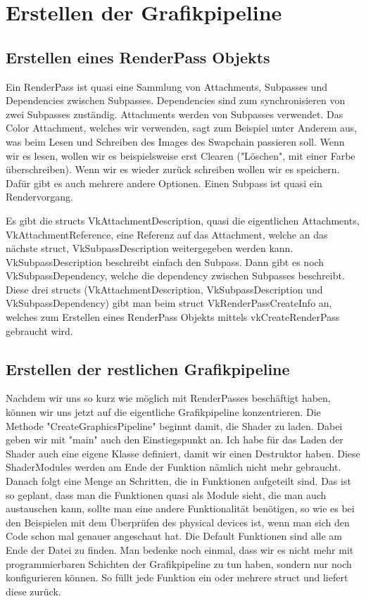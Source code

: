 \documentclass[11pt,a4paper]{report}
\begin{document}
\section{Erstellen der Grafikpipeline}
\subsection{Erstellen eines RenderPass Objekts}
Ein RenderPass ist quasi eine Sammlung von Attachments, Subpasses und Dependencies zwischen Subpasses. Dependencies sind zum synchronisieren von zwei Subpasses zuständig. Attachments werden von Subpasses verwendet. Das Color Attachment, welches wir verwenden, sagt zum Beispiel unter Anderem aus, was beim Lesen und Schreiben des Images des Swapchain passieren soll. Wenn wir es lesen, wollen wir es beispielsweise erst Clearen ("Löschen", mit einer Farbe überschreiben). Wenn wir es wieder zurück schreiben wollen wir es speichern. Dafür gibt es auch mehrere andere Optionen. Einen Subpass ist quasi ein Rendervorgang.

Es gibt die structs VkAttachmentDescription, quasi die eigentlichen Attachments, VkAttachmentReference, eine Referenz auf das Attachment, welche an das nächste struct, VkSubpassDescription weitergegeben werden kann. VkSubpassDescription beschreibt einfach den Subpass. Dann gibt es noch VkSubpassDependency, welche die dependency zwischen Subpasses beschreibt. Diese drei structs (VkAttachmentDescription, VkSubpassDescription und VkSubpassDependency) gibt man beim struct VkRenderPassCreateInfo an, welches zum Erstellen eines RenderPass Objekts mittels vkCreateRenderPass gebraucht wird.

\subsection{Erstellen der restlichen Grafikpipeline}
Nachdem wir uns so kurz wie möglich mit RenderPasses beschäftigt haben, können wir uns jetzt auf die eigentliche Grafikpipeline konzentrieren. Die Methode "CreateGraphicsPipeline" beginnt damit, die Shader zu laden. Dabei geben wir mit "main" auch den Einstiegspunkt an. Ich habe für das Laden der Shader auch eine eigene Klasse definiert, damit wir einen Destruktor haben. Diese ShaderModules werden am Ende der Funktion nämlich nicht mehr gebraucht. Danach folgt eine Menge an Schritten, die in Funktionen aufgeteilt sind. Das ist so geplant, dass man die Funktionen quasi als Module sieht, die man auch austauschen kann, sollte man eine andere Funktionalität benötigen, so wie es bei den Beispielen mit dem Überprüfen des physical devices ist, wenn man sich den Code schon mal genauer angeschaut hat. Die Default Funktionen sind alle am Ende der Datei zu finden. Man bedenke noch einmal, dass wir es nicht mehr mit programmierbaren Schichten der Grafikpipeline zu tun haben, sondern nur noch konfigurieren können. So füllt jede Funktion ein oder mehrere struct und liefert diese zurück.
\end{document}
